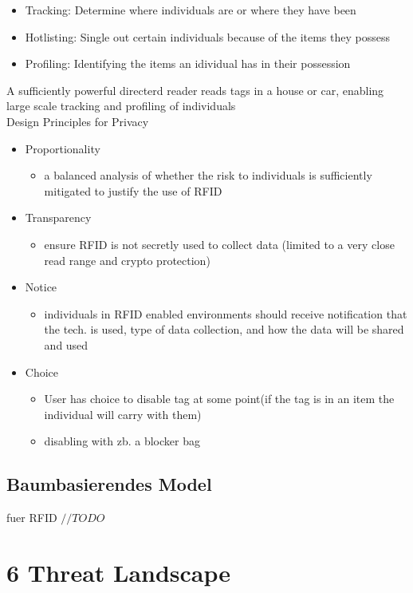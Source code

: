 \documentclass[a4paper, 12pt]{article}
\begin{document}
\begin{itemize}
\item Tracking: Determine where individuals are or where they have been
\item Hotlisting: Single out certain individuals because of the items they possess
\item Profiling: Identifying the items an idividual has in their possession
\end{itemize}
A sufficiently powerful directerd reader reads tags in a house or car, enabling large scale tracking and profiling of individuals \\ \newline
\large Design Principles for Privacy
\begin{itemize}
\item Proportionality
\begin{itemize}
\item a balanced analysis of whether the risk to individuals is sufficiently mitigated to justify the use of RFID
\end{itemize}
\item Transparency
\begin{itemize}
\item ensure RFID is not secretly used to collect data (limited to a very close read range and crypto protection)
\end{itemize}
\item Notice
\begin{itemize}
\item individuals in RFID enabled environments should receive notification that the tech. is used, type of data collection, and how the data will be shared and used
\end{itemize}
\item Choice
\begin{itemize}
\item User has choice to disable tag at some point(if the tag is in an item the individual will carry with them)
\item disabling with zb. a blocker bag
\end{itemize}
\end{itemize}


\subsection{Baumbasierendes Model}
fuer RFID
$ //TODO $


\section{6 Threat Landscape}
\end{document}
